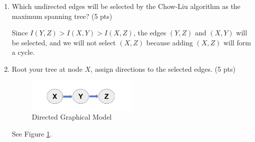 \documentclass[a4paper]{article}
\theoremstyle{definition}
\newenvironment{soln}{
	\leavevmode\color{blue}\ignorespaces
}{}
\begin{document}
\begin{enumerate}
	\item Which undirected edges will be selected by the Chow-Liu algorithm as the maximum spanning tree? (5 pts)
	\begin{soln}
		Since $I(Y, Z) > I(X, Y) > I(X, Z)$, the edges $(Y,Z)$ and $(X,Y)$ will be selected, and we will not select $(X,Z)$ because adding $(X,Z)$ will form a cycle.
	\end{soln}
	\item Root your tree at node $X$, assign directions to the selected edges. (5 pts)
	\begin{soln}
		\begin{figure}[H]
			\centering
			\includegraphics[width=0.5\textwidth]{TREE.png}
			\caption{Directed Graphical Model}
			\label{fig:diagram}
		\end{figure}
		See Figure \ref{fig:diagram}.
	\end{soln}
\end{enumerate}

	
	
\end{document}
